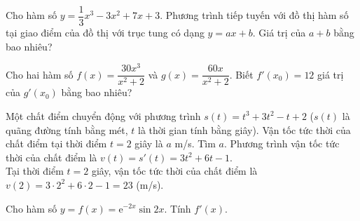 \begin{bt}%
	Cho hàm số $y=\dfrac{1}{3}x^3-3x^2+7x+3$. Phương trình tiếp tuyến với đồ thị hàm số tại giao điểm của đồ thị với trục tung có dạng $y=ax+b$. Giá trị của $a+b$ bằng bao nhiêu?
\end{bt}

\begin{bt}%
	Cho hai hàm số $f(x)=\dfrac{30x^3}{x^2+2}$ và $g(x)=\dfrac{60x}{x^2+2}$. Biết $f'(x_0)=12$ giá trị của $g'(x_0)$ bằng bao nhiêu?
\end{bt}

\begin{bt}%
Một chất điểm chuyển động với phương trình $s(t)=t^3+3t^2-t+2$ ($s(t)$ là quãng đường tính bằng mét, $t$ là thời gian tính bằng giây). Vận tốc tức thời của chất điểm tại thời điểm $t=2$ giây là $a$ m/s. Tìm $a$.
\loigiai
{
Phương trình vận tốc tức thời của chất điểm là $v(t)=s'(t)=3t^2+6t-1$. \\
Tại thời điểm $t=2$ giây, vận tốc tức thời của chất điểm là $v(2)=3\cdot2^2+6\cdot 2-1=23$ (m/s).
}
\end{bt}

\begin{bt}%
	Cho hàm số $y=f(x)=\mathrm{e}^{-2x}\sin 2x$. Tính $f'(x)$.
\end{bt}

